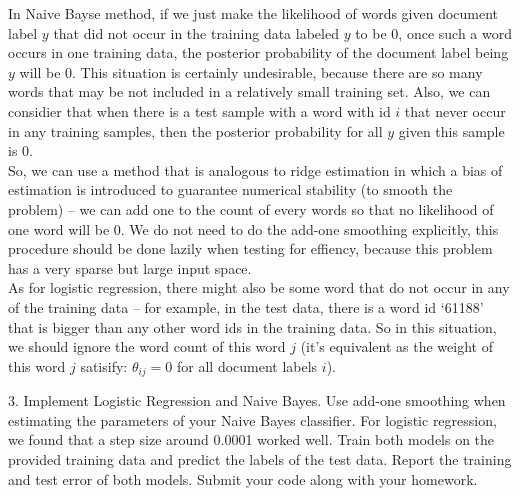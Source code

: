 \documentclass{article}
\theoremstyle{definition}
\theoremstyle{definition}
\theoremstyle{remark}
\begin{document}
\begin{addmargin}[3em]{2em}
  In Naive Bayse method, if we just make the likelihood of words given document label $y$ that did not occur in the training data labeled $y$ to be 0, once such a word occurs in one training data, the posterior probability of the document label being $y$ will be 0. This situation is certainly undesirable, because there are so many words that may be not included in a relatively small training set. Also, we can considier that when there is a test sample with a word with id $i$ that never occur in any training samples, then the posterior probability for all $y$ given this sample is 0. \\
  So, we can use a method that is analogous to ridge estimation in which a bias of estimation is introduced to guarantee numerical stability (to smooth the problem) -- we can add one to the count of every words so that no likelihood of one word will be 0. We do not need to do the add-one smoothing explicitly, this procedure should be done lazily when testing for effiency, because this problem has a very sparse but large input space.\\
  As for logistic regression, there might also be some word that do not occur in any of the training data -- for example, in the test data, there is a word id `61188' that is bigger than any other word ids in the training data. So in this situation, we should ignore the word count of this word $j$ (it's equivalent as the weight of this word $j$ satisify: $\theta_{ij} = 0$ for all document labels $i$).

\end{addmargin}

3. Implement Logistic Regression and Naive Bayes. Use add-one smoothing when estimating
the parameters of your Naive Bayes classifier. For logistic regression, we found that a step size around
0.0001 worked well. Train both models on the provided training data and predict the labels of the test
data. Report the training and test error of both models. Submit your code along with your homework.
\end{document}
